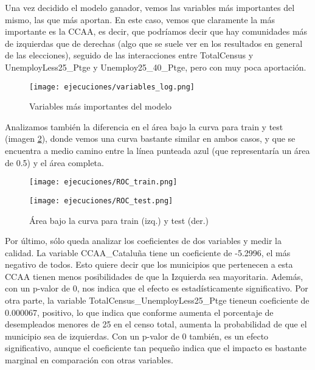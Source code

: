 \documentclass[a4paper,onecolumn]{extarticle}
\begin{document}
\begin{sloppypar}
Una vez decidido el modelo ganador, vemos las variables más importantes del mismo, las que más aportan. En este caso, vemos que claramente la más importante es 
la CCAA, es decir, que podríamos decir que hay comunidades más de izquierdas que de derechas (algo que se suele ver en los resultados en general de las elecciones),
seguido de las interacciones entre TotalCensus y UnemployLess25\_Ptge y Unemploy25\_40\_Ptge, pero con muy poca aportación.
\begin{center}
    \begin{figure}[h]
        \centering
        \texttt{[image: ejecuciones/variables\_log.png]}
        \caption{Variables más importantes del modelo}
        \label{fig:variables}
    \end{figure}
\end{center}

Analizamos también la diferencia en el área bajo la curva para train y test (imagen \ref{fig:ROC}), donde vemos una curva bastante similar en ambos casos, y que 
se encuentra a medio camino entre la línea punteada azul (que representaría un área de 0.5) y el área completa.

\begin{figure}[h!]
    \centering
    \begin{minipage}{0.45\textwidth}
        \centering
        \texttt{[image: ejecuciones/ROC\_train.png]}
    \end{minipage}%
    \begin{minipage}{0.45\textwidth}
        \centering
        \texttt{[image: ejecuciones/ROC\_test.png]}
    \end{minipage}
    \caption{Área bajo la curva para train (izq.) y test (der.)}
    \label{fig:ROC}
\end{figure}

Por último, sólo queda analizar los coeficientes de dos variables y medir la calidad. La variable CCAA\_Cataluña tiene un coeficiente de -5.2996, el más 
negativo de todos. Esto quiere decir que los municipios que pertenecen a esta CCAA tienen menos posibilidades de que la Izquierda sea mayoritaria. Además, con 
un p-valor de 0, nos indica que el efecto es estadísticamente significativo. Por otra parte, la variable TotalCensus\_UnemployLess25\_Ptge tieneun coeficiente 
de 0.000067, positivo, lo que indica que conforme aumenta el porcentaje de desempleados menores de 25 en el censo total, aumenta la probabilidad de que el 
municipio sea de izquierdas. Con un p-valor de 0 también, es un efecto significativo, aunque el coeficiente tan pequeño indica que el impacto es bastante 
marginal en comparación con otras variables.


\end{sloppypar}
\end{document}
